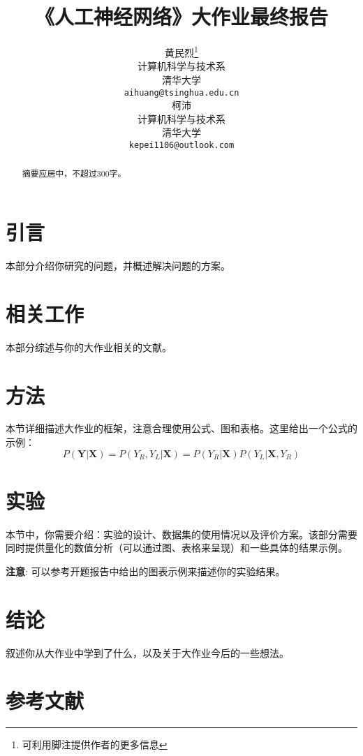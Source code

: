 \documentclass{ctexart}
\title{《人工神经网络》大作业最终报告}
\author{
  黄民烈\thanks{可利用脚注提供作者的更多信息} \\
  计算机科学与技术系 \\
  清华大学 \\
  \texttt{aihuang@tsinghua.edu.cn} \\
  \AND
  柯沛\\
  计算机科学与技术系 \\
  清华大学 \\
  \texttt{kepei1106@outlook.com} \\
}
\begin{document}
\maketitle

\begin{abstract}

摘要应居中，不超过300字。

\end{abstract}


\section{引言}

本部分介绍你研究的问题，并概述解决问题的方案。


\section{相关工作}

本部分综述与你的大作业相关的文献。

\section{方法}

本节详细描述大作业的框架，注意合理使用公式、图和表格。这里给出一个公式的示例：
\begin{equation}
P(\mathbf{Y}|\mathbf{X})  =  P(Y_R, Y_L|\mathbf{X}) = P(Y_R|\mathbf{X})P(Y_L|\mathbf{X}, Y_R)
\end{equation}

\section{实验}

本节中，你需要介绍：实验的设计、数据集的使用情况以及评价方案。该部分需要同时提供量化的数值分析（可以通过图、表格来呈现）和一些具体的结果示例。


\textbf{注意}: 可以参考开题报告中给出的图表示例来描述你的实验结果。


\section{结论}

叙述你从大作业中学到了什么，以及关于大作业今后的一些想法。

\section*{参考文献}
\end{document}
